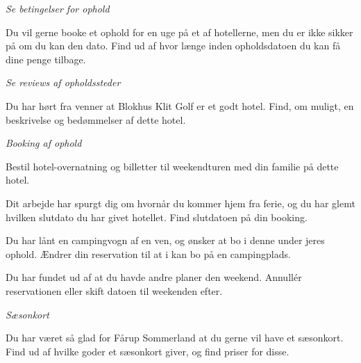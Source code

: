 \documentclass[10pt,a4paper]{article}      %
\begin{document}
\begin{opgaver}
\item {\it Se betingelser for ophold}
    \begin{opgaver}
    \item Du vil gerne booke et ophold for en uge på et af hotellerne, men du
    er ikke sikker på om du kan den dato. Find ud af hvor længe inden opholdsdatoen
    du kan få dine penge tilbage.
    \end{opgaver}

\item {\it Se reviews af opholdssteder}
    \begin{opgaver}
    \item Du har hørt fra venner at Blokhus Klit Golf er et godt hotel. Find,
    om muligt, en beskrivelse og bedømmelser af dette hotel.
    \end{opgaver}

\item {\it Booking af ophold}
    \begin{opgaver}
    \item Bestil hotel-overnatning og billetter til weekendturen med din
    familie på dette hotel.
    \item Dit arbejde har spurgt dig om hvornår du kommer hjem fra ferie, og du
    har glemt hvilken slutdato du har givet hotellet. Find slutdatoen på din
    booking.
    \item Du har lånt en campingvogn af en ven, og ønsker at bo i denne under
    jeres ophold. Ændrer din reservation til at i kan bo på en campingplads.
    \item Du har fundet ud af at du havde andre planer den weekend. Annullér
    reservationen eller skift datoen til weekenden efter.
    \end{opgaver}

\item {\it Sæsonkort}
    \begin{opgaver}
    \item Du har været så glad for Fårup Sommerland at du gerne vil have et
    sæsonkort. Find ud af hvilke goder et sæsonkort giver, og find priser for
    disse.
    \end{opgaver}


\end{opgaver}
\end{document}
